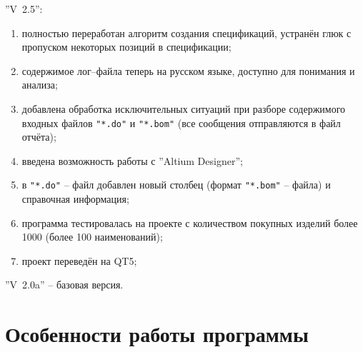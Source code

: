 ''V~2.5'':
\begin{enumerate}
  \item полностью переработан алгоритм создания спецификаций, устранён глюк с пропуском некоторых позиций в спецификации;
  \item содержимое лог--файла теперь на русском языке, доступно для понимания и анализа;
  \item добавлена обработка исключительных ситуаций при разборе содержимого входных файлов \verb|"*.do"| и \verb|"*.bom"| (все сообщения отправляются в файл отчёта);
  \item введена возможность работы с ''Altium Designer'';
  \item в \verb|"*.do"| -- файл добавлен новый столбец (формат \verb|"*.bom"| -- файла) и справочная информация;
  \item программа тестировалась на проекте с количеством покупных изделий более 1000 (более 100 наименований);
  \item проект переведён на QT5;
\end{enumerate}

''V~2.0a'' -- базовая версия.



\section{Особенности работы программы}

